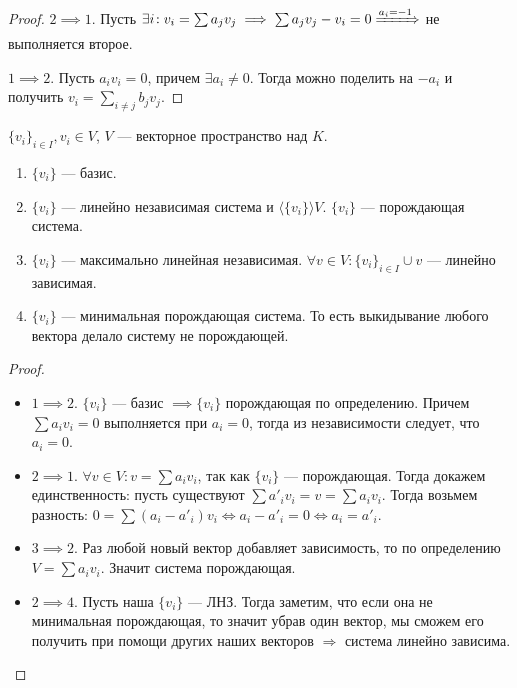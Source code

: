 \begin{proof}
    $2 \implies 1$.  Пусть  $\exists i\!: v_i = \sum a_j v_j \implies \sum a_j v_j - v_i = 0 \xRightarrow{a_i = -1}$ не выполняется второе.

    $1 \implies 2$. Пусть  $a_i v_i = 0$, причем  $\exists a_i \neq 0$. Тогда можно поделить на  $-a_i$ и получить  $v_i = \sum\limits_{i \neq j} b_j v_j$.
\end{proof}
\begin{theorem}
    $\{v_i\}_{i \in I}, v_i \in V$,  $V$ --- векторное пространство над $K$.
     \begin{enumerate} 
         \item $\{v_i\}$ --- базис.
         \item $\{v_i\}$ --- линейно независимая система и  $\langle \{v_i\} \rangle V$.  $\{v_i\}$ --- порождающая система.
         \item  $\{v_i\}$ --- максимально линейная независимая. $\forall v \in V\!: \{v_i\}_{i \in I} \cup v$ --- линейно зависимая.
         \item  $\{v_i\}$ --- минимальная порождающая система. То есть выкидывание любого вектора делало систему не порождающей.
    \end{enumerate}
\end{theorem}
\begin{proof}
    \slashn
     \begin{itemize}
         \item $1 \implies 2$.  $\{v_i\}$ --- базис  $\implies \{v_i\}$ порождающая по определению. Причем  $\sum a_i v_i = 0$ выполняется при  $a_i = 0$, тогда из независимости следует, что  $a_i = 0$.  
         \item $2 \implies 1$.  $\forall v \in V\!: v = \sum a_i v_i$, так как $\{v_i\}$ --- порождающая. Тогда докажем единственность: пусть существуют $\sum a'_i v_i = v = \sum a_i v_i$. Тогда возьмем разность: $0 = \sum (a_i - a'_i) v_i \iff a_i - a'_i = 0 \iff a_i = a'_i$.
         \item  $3 \implies 2$. Раз любой новый вектор добавляет зависимость, то по определению  $V = \sum a_i v_i$. Значит система порождающая. 
         \item $2 \implies 4$. Пусть наша  $\{v_i\}$ --- ЛНЗ. Тогда заметим, что если она не минимальная порождающая, то значит убрав один вектор, мы сможем его получить при помощи других наших векторов  $\Rightarrow$ система линейно зависима.
    \end{itemize}
\end{proof}


